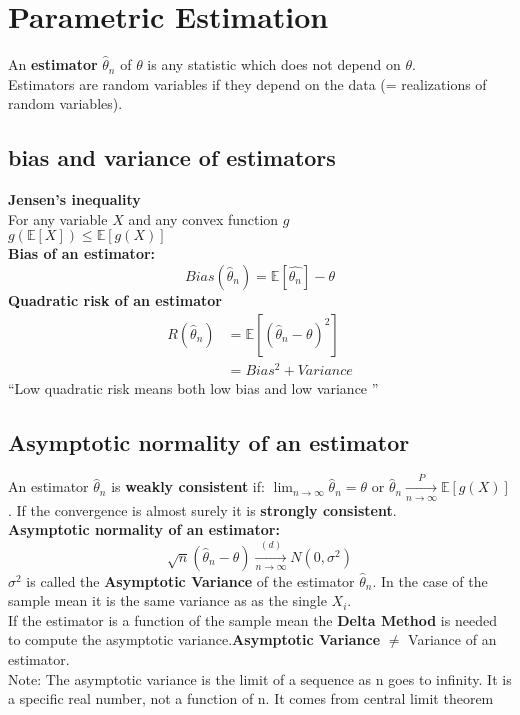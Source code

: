 \section{Parametric Estimation}

An \textbf{estimator} $\hat{\theta }_ n$ of $\theta$ is any statistic which does not depend on $\theta$.\\
Estimators are random variables if they depend on the data (= realizations of random variables).\\
\subsection{bias and variance of estimators}
\textbf{Jensen's inequality}\\
For any variable $X$ and any convex function $g$ \\
$g(\mathbb{E}[X]) \leq \mathbb{E}[g(X)]$ \\
\textbf{Bias of an estimator:}
\[Bias(\hat{\theta}_n) = \mathbb{E}[\hat{\theta_n}] - \theta\]
\textbf{Quadratic risk of an estimator}
\begin{align*}
R(\hat{\theta}_n) & = \mathbb{E}[(\hat{\theta}_n-\theta)^2]\\
& = Bias^2 + Variance
\end{align*}
\textquotedblleft Low quadratic risk means both low bias and low variance \textquotedblright
\subsection{Asymptotic normality of an estimator}
An estimator $\hat{\theta }_ n$ is \textbf{weakly consistent} if: $\displaystyle \lim _{n \to \infty } \hat{\theta }_ n = \theta$ or $ \hat{\theta}_n \xrightarrow[n \rightarrow \infty]{P} \mathbb{E}[g(X)]$. If the convergence is almost surely it is \textbf{strongly consistent}.\\
\textbf{Asymptotic normality of an estimator:}
\[\sqrt{n} (\hat{\theta}_n-\theta) \xrightarrow[n \rightarrow \infty]{(d)} N(0,\sigma^2)\]
$\sigma^2$ is called the \textbf{Asymptotic Variance} of the estimator $\hat{\theta}_n$. In the case of the sample mean it is the same variance as as the single $X_i$.\\
If the estimator is a function of the sample mean the \textbf{Delta Method} is needed to compute the asymptotic variance.\textbf{Asymptotic Variance} $\neq$ Variance of an estimator.\\
Note: The asymptotic variance is the limit of a sequence as n goes to infinity. It is a specific real number, not a function of n. It comes from central limit theorem\\